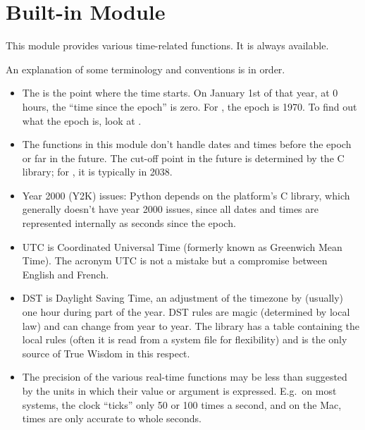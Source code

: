 \section{Built-in Module }



This module provides various time-related functions.
It is always available.

An explanation of some terminology and conventions is in order.

\begin{itemize}

\item
The  is the point where the time starts.  On
January 1st of that year, at 0 hours, the ``time since the epoch'' is
zero.  For \UNIX{}, the epoch is 1970.  To find out what the epoch is,
look at .%

\item
The functions in this module don't handle dates and times before the
epoch or far in the future.  The cut-off point in the future is
determined by the C library; for \UNIX{}, it is typically in 2038.%

\item
Year 2000 (Y2K) issues: Python depends on the platform's C library,
which generally doesn't have year 2000 issues, since all dates and
times are represented internally as seconds since the epoch.%
%

\item
UTC is Coordinated Universal Time (formerly known as Greenwich Mean
Time).  The acronym UTC is not a mistake but a compromise between
English and French.%
%
%

\item
DST is Daylight Saving Time, an adjustment of the timezone by
(usually) one hour during part of the year.  DST rules are magic
(determined by local law) and can change from year to year.  The \C{}
library has a table containing the local rules (often it is read from
a system file for flexibility) and is the only source of True Wisdom
in this respect.%

\item
The precision of the various real-time functions may be less than
suggested by the units in which their value or argument is expressed.
E.g.\ on most \UNIX{} systems, the clock ``ticks'' only 50 or 100 times a
second, and on the Mac, times are only accurate to whole seconds.


\end{itemize}
